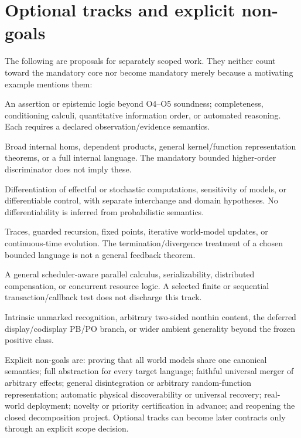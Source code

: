 \documentclass[11pt,a4paper]{article}
\begin{document}
\section{Optional tracks and explicit non-goals}\label{sec:optional}

The following are proposals for separately scoped work. They neither count
toward the mandatory core nor become mandatory merely because a motivating
example mentions them:
\begin{description}[style=nextline]
\item[Rich logic and inference.]
An assertion or epistemic logic beyond O4--O5 soundness; completeness,
conditioning calculi, quantitative information order, or automated reasoning.
Each requires a declared observation/evidence semantics.
\item[Closed and dependent higher-order structure.]
Broad internal homs, dependent products, general kernel/function
representation theorems, or a full internal language. The mandatory bounded
higher-order discriminator does not imply these.
\item[Differential structure.]
Differentiation of effectful or stochastic computations, sensitivity of
models, or differentiable control, with separate interchange and domain
hypotheses. No differentiability is inferred from probabilistic semantics.
\item[Feedback and recursion.]
Traces, guarded recursion, fixed points, iterative world-model updates, or
continuous-time evolution. The termination/divergence treatment of a chosen
bounded language is not a general feedback theorem.
\item[Concurrency and transactions.]
A general scheduler-aware parallel calculus, serializability, distributed
compensation, or concurrent resource logic. A selected finite or sequential
transaction/callback test does not discharge this track.
\item[Additional structural recognition.]
Intrinsic unmarked recognition, arbitrary two-sided nonthin content,
the deferred display/codisplay PB/PO branch, or wider ambient generality
beyond the frozen positive class.
\end{description}

Explicit non-goals are: proving that all world models share one canonical
semantics; full abstraction for every target language; faithful universal
merger of arbitrary effects; general disintegration or arbitrary random-function
representation; automatic physical discoverability or universal recovery;
real-world deployment; novelty or priority certification in advance; and
reopening the closed decomposition project. Optional tracks can become later
contracts only through an explicit scope decision.
\end{document}
